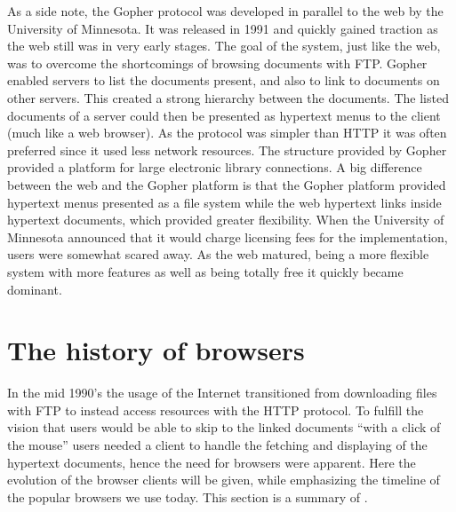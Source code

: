     As a side note, the Gopher protocol was developed in parallel to the web by the University of Minnesota.
    It was released in 1991 and quickly gained traction as the \gls{web} still was in very early stages.
    The goal of the system, just like the \gls{web}, was to overcome the shortcomings of browsing \glspl{document} with \gls{FTP}.
    Gopher enabled servers to list the \glspl{document} present, and also to link to \glspl{document} on other servers.
    This created a strong hierarchy between the \glspl{document}.
    The listed \glspl{document} of a server could then be presented as \gls{hypertext} menus to the client (much like a \gls{web} \gls{browser}).
    As the protocol was simpler than \gls{HTTP} it was often preferred since it used less network resources.
    The structure provided by Gopher provided a platform for large electronic library connections.
    A big difference between the \gls{web} and the Gopher platform is that the Gopher platform provided \gls{hypertext} menus presented as a file system while the \gls{web} \gls{hypertext} links inside \gls{hypertext} \glspl{document}, which provided greater flexibility.
    When the University of Minnesota announced that it would charge licensing fees for the implementation, users were somewhat scared away.
    As the \gls{web} matured, being a more flexible system with more features as well as being totally free it quickly became dominant.

  \section{The history of browsers}
    \label{sec:browsers}
    In the mid 1990's the usage of the Internet transitioned from downloading files with \gls{FTP} to instead access resources with the \gls{HTTP} protocol.
    To fulfill the vision that users would be able to skip to the linked \glspl{document} ``with a click of the mouse'' users needed a client to handle the fetching and displaying of the \gls{hypertext} \glspl{document}, hence the need for \glspl{browser} were apparent.
    Here the evolution of the \gls{browser} clients will be given, while emphasizing the timeline of the popular \glspl{browser} we use today.
    This section is a summary of .

